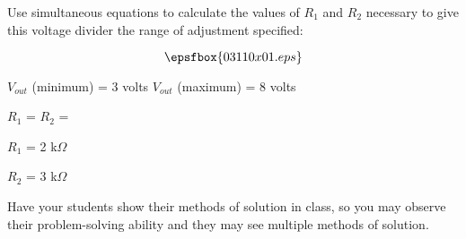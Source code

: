 

Use simultaneous equations to calculate the values of $R_1$ and $R_2$ necessary to give this voltage divider the range of adjustment specified:

$$\epsfbox{03110x01.eps}$$

$V_{out}$ (minimum) = 3 volts \hskip 30pt $V_{out}$ (maximum) = 8 volts

\vskip 20pt

$R_1$ = \hskip 80pt $R_2$ =

\vskip 10pt







$R_1$ = 2 k$\Omega$

\vskip 10pt

$R_2$ = 3 k$\Omega$







Have your students show their methods of solution in class, so you may observe their problem-solving ability and they may see multiple methods of solution.




